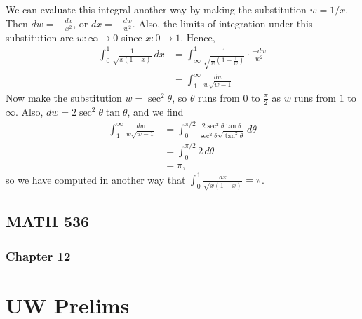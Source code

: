 \documentclass[11pt]{book}
\theoremstyle{definition}
\begin{document}
\begin{enumerate}
        We can evaluate this integral another way by making the substitution $w = 1/x$.  Then $dw = - \frac{dx}{x^2}$, or $dx = -\frac{dw}{w^2}$.   Also, the limits of integration under this substitution are $w : \infty \to 0$ since $x : 0\to 1$.  Hence,
        \begin{align*}
            \int_0^1 \frac{1}{\sqrt{x(1-x)}} \, dx &= \int_{\infty}^1 \frac{1}{\sqrt{\tfrac{1}{w} ( 1 - \tfrac 1 w) }} \cdot \frac{-dw}{w^2} \\
            &= \int_1^\infty \frac{dw }{w \sqrt{w-1}} 
        \end{align*}
        Now make the substitution $w = \sec^2 \theta$, so $\theta$ runs from $0$ to $\tfrac \pi 2$ as $w$ runs from $1$ to $\infty$.   Also, $dw = 2\sec^2 \theta \tan \theta$, and we find 
        \begin{align*}
            \int_1^\infty \frac{dw}{w \sqrt{w-1}}   &= \int_0^{\pi/2}  \frac{2\sec^2 \theta \tan \theta}{\sec^2 \theta \sqrt{\tan^2\theta}} \, d\theta \\
            &= \int_0^{\pi/2} 2 \, d\theta \\
            &= \pi,
        \end{align*}
        so we have computed in another way that $\int_0^1 \frac{dx}{\sqrt{x(1-x)}}  = \pi$. 
\end{enumerate}
\section{MATH 536}
\subsection{Chapter 12}
\chapter{UW Prelims}
\end{document}
